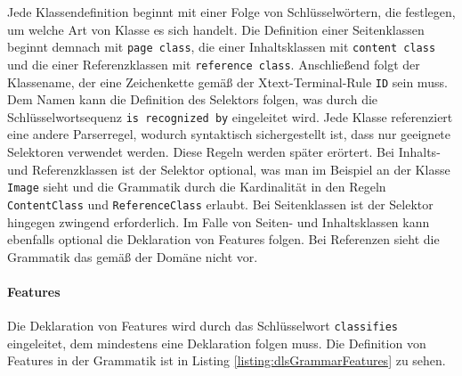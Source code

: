     Jede Klassendefinition beginnt mit einer Folge von Schlüsselwörtern,
    die festlegen, um welche Art von Klasse es sich handelt.
    Die Definition einer Seitenklassen beginnt demnach mit \texttt{page class},
    die einer Inhaltsklassen mit \texttt{content class} und die einer
    Referenzklassen mit \texttt{reference class}.
    Anschließend folgt der Klassename, der eine Zeichenkette gemäß
    der Xtext-Terminal-Rule \texttt{ID} \cite[Kapitel "`Common Terminals"']{xtext:documentation} sein muss.
    Dem Namen kann die Definition des Selektors folgen,
    was durch die Schlüsselwortsequenz \texttt{is recognized by} eingeleitet wird.
    Jede Klasse referenziert eine andere Parserregel,
    wodurch syntaktisch sichergestellt ist, dass nur geeignete Selektoren
    verwendet werden.
    Diese Regeln werden später erörtert.
    Bei Inhalts- und Referenzklassen ist der Selektor optional,
    was man im Beispiel an der Klasse \texttt{Image} sieht und
    die Grammatik durch die Kardinalität in den Regeln \texttt{ContentClass}
    und \texttt{ReferenceClass} erlaubt.
    Bei Seitenklassen ist der Selektor hingegen zwingend erforderlich.
    Im Falle von Seiten- und Inhaltsklassen kann ebenfalls optional die Deklaration von Features folgen.
    Bei Referenzen sieht die Grammatik das gemäß der Domäne nicht vor.

    \paragraph*{Features}
    Die Deklaration von Features wird durch das Schlüsselwort \texttt{classifies} eingeleitet,
    dem mindestens eine Deklaration folgen muss.
    Die Definition von Features in der Grammatik ist in Listing \ref{listing:dlsGrammarFeatures} zu sehen.

    

